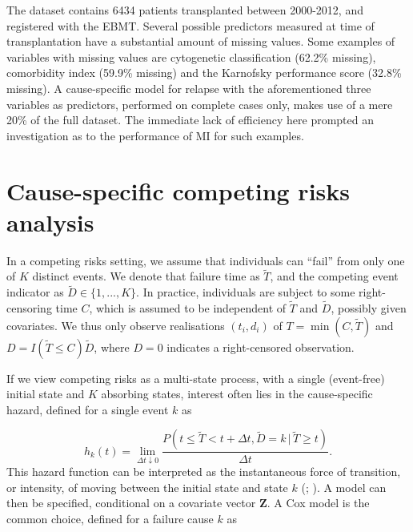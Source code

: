 \documentclass[
  letterpaper,
  DIV=11,
  numbers=noendperiod]{scrreprt}
\newcommand{\given}{\,|\,}
\begin{document}
The dataset contains 6434 patients transplanted between 2000-2012, and
registered with the EBMT. Several possible predictors measured at time
of transplantation have a substantial amount of missing values. Some
examples of variables with missing values are cytogenetic classification
(62.2\% missing), comorbidity index (59.9\% missing) and the Karnofsky
performance score (32.8\% missing). A cause-specific model for relapse
with the aforementioned three variables as predictors, performed on
complete cases only, makes use of a mere 20\% of the full dataset. The
immediate lack of efficiency here prompted an investigation as to the
performance of MI for such examples.

\section{Cause-specific competing risks analysis}\label{sec-comprisks}

In a competing risks setting, we assume that individuals can ``fail''
from only one of \(K\) distinct events. We denote that failure time as
\(\tilde{T}\), and the competing event indicator as
\(\tilde{D} \in \{1,...,K\}\). In practice, individuals are subject to
some right-censoring time \(C\), which is assumed to be independent of
\(\tilde{T}\) and \(\tilde{D}\), possibly given covariates. We thus only
observe realisations \((t_i, d_i)\) of \(T = \min(C,\tilde{T})\) and
\(D = I(\tilde{T} \leq C)\tilde{D}\), where \(D = 0\) indicates a
right-censored observation.

If we view competing risks as a multi-state process, with a single
(event-free) initial state and \(K\) absorbing states, interest often
lies in the cause-specific hazard, defined for a single event \(k\) as

\begin{equation*}
    h_k(t) = \lim_{\Delta t \downarrow 0} \frac{P(t \leq \tilde{T} < t + \Delta t, \tilde{D} = k \given \tilde{T} \geq t)}{\Delta t}.
\end{equation*} This hazard function can be interpreted as the
instantaneous force of transition, or intensity, of moving between the
initial state and state \(k\)
(;
). A model can then be specified, conditional on a covariate
vector \(\mathbf{Z}\). A Cox model is the common choice, defined for a
failure cause \(k\) as
\end{document}
